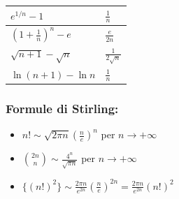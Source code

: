 \documentclass[10pt, a4paper]{article}
\begin{document}
\begin{center}
\begin{tabular}{|ll|}
                \hline
                $\displaystyle e^{1/n} - 1$ & $\displaystyle\frac{1}{n}$ \\
                \hline
                $\displaystyle\left(1+\frac{1}{n}\right)^n - e$ & $\displaystyle\frac{e}{2n}$ \\
                \hline
                $\displaystyle\sqrt{n+1} - \sqrt{n}$ & $\displaystyle\frac{1}{2\sqrt{n}}$ \\
                \hline
                $\displaystyle\ln(n+1) - \ln n$ & $\displaystyle\frac{1}{n}$ \\
                \hline
            \end{tabular}
        \end{center}

        \subsubsection*{Formule di Stirling:}
        \begin{itemize}
            \item $n! \sim \sqrt{2\pi n}\left(\frac{n}{e}\right)^n$ per $n \to +\infty$
            \item $\binom{2n}{n} \sim \frac{4^n}{\sqrt{\pi n}}$ per $n \to +\infty$
            \item $\{(n!)^2\} \sim \frac{2\pi n}{e^{2n}}\left(\frac{n}{e}\right)^{2n} = \frac{2\pi n}{e^{2n}}(n!)^2$
        \end{itemize}
\end{document}
